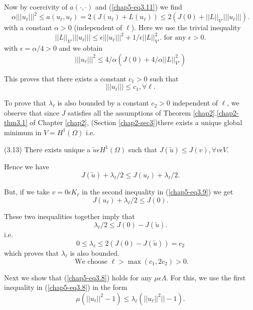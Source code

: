 Now by coercivity of $a(\cdot , \cdot)$ and (\ref{chap5-eq3.11}) we find
$$
\alpha |||u_{\ell}|||^{2} \leq a(u_{\ell}, u_{\ell}) = 2(J(u_{\ell}) + L(u_{\ell})) \leq 2 (J(0) + ||L||_{V'} |||u_{\ell}|||).
$$
with a constant $\alpha > 0$ (independent of $\ell$). Here we use the trivial inequality
$$
||L||_{V'} |||u_{\ell}||| \leq \epsilon |||u_{\ell}|||^{2} + 1 / \epsilon ||L||_{V'}^{2}. \text{ for any } \epsilon > 0.
$$
with $\epsilon = \alpha / 4 > 0$ and we obtain
$$
|||u_{\ell}|||^{2} \leq 4/\alpha (J(0) + 4/\alpha ||L||_{V'}^{2})
$$

This proves that there exists a constant $c_{1} > 0$ such that
\begin{equation*}
||| u_{\ell} ||| \leq c_{1} , \forall \ell.\tag{3.12}\label{chap5-eq3.12}
\end{equation*}

To prove that $\lambda_{\ell}$ is also bounded by a constant $c_{2} > 0$ independent of $\ell$, we observe that since $J$ satisfies all the assumptions of Theorem \ref{chap2}.\ref{chap2-thm3.1} of Chapter \ref{chap2}, (Section \ref{chap2-sec3})\pageoriginale there exists a unique global minimum in $V = H^{1} (\Omega)$ i.e. 

\medskip
\noindent
(3.13) There exists unique a $\widetilde{u} \epsilon H^{1} (\Omega)$ such that $J(\widetilde{u}) \leq J(v), \forall v \epsilon V$.

Hence we have
$$
J(\widetilde{u}) + \lambda_{\ell} / 2 \leq J(u_{\ell}) + \lambda_{\ell} / 2.
$$ 

But, if we take $v = 0 \epsilon K_{\ell}$ in the second inequality in (\ref{chap5-eq3.9}) we get
$$
J(u_{\ell}) + \lambda_{\ell} / 2 \leq J(0).
$$

These two inequalities together imply that
$$
\lambda_{\ell} / 2 \leq J(0) - J(\widetilde{u}).
$$
i.e. 
\begin{equation*}
0 \leq \lambda_{\ell} \leq 2(J(0) - J(\widetilde{u})) = c_{2}\tag{3.14}\label{chap5-eq3.14}
\end{equation*}
which proves that $\lambda_{\ell}$ is also bounded.
\begin{equation*}
\text{ We choose } \ell > \max (c_{1}, 2c_{2}) > 0.\tag{3.15}\label{chgap5-eq3.15}
\end{equation*}

Next we show that (\ref{chap5-eq3.8}) holds for any $\mu \epsilon \Lambda$. For this, we use the first inequality in (\ref{chap5-eq3.8}) in the form
$$
\mu (|| u_{\ell}||^{2} - 1) \leq \lambda_{\ell} (|| u_{\ell}||^{2}|| - 1).
$$

